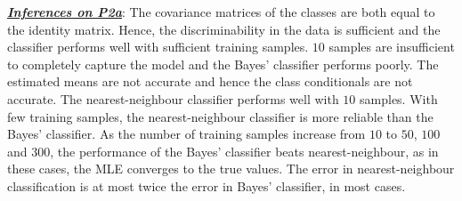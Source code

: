 \documentclass[12pt, a4 paper]{article}
\begin{document}
\underline {\it \bfseries Inferences on P2a}: The covariance matrices of the classes are both equal to the identity matrix. Hence, the discriminability in the data is sufficient and the classifier performs well with sufficient training samples. $10$ samples are insufficient to completely capture the model and the Bayes' classifier performs poorly. The estimated means are not accurate and hence the class conditionals are not accurate. The nearest-neighbour classifier performs well with $10$ samples. With few training samples, the nearest-neighbour classifier is more reliable than the Bayes' classifier. As the number of training samples increase from $10$ to $50$, $100$ and $300$, the performance of the Bayes' classifier beats nearest-neighbour, as in these cases, the MLE converges to the true values. The error in nearest-neighbour classification is at most twice the error in Bayes' classifier, in most cases. \\
\end{document}

